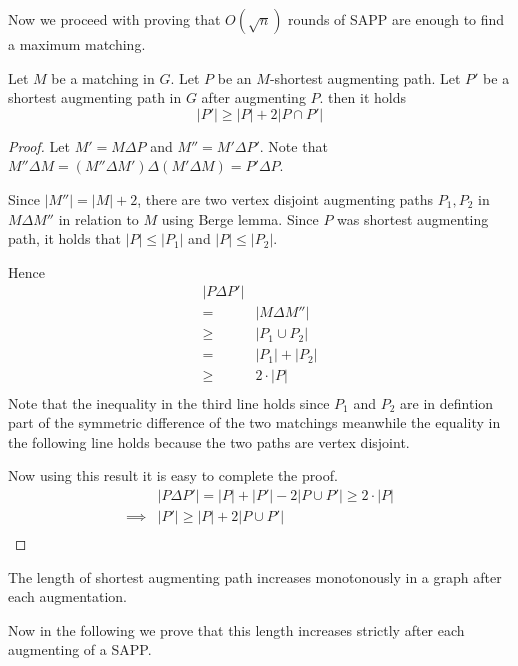 Now we proceed with proving that $O(\sqrt n)$ rounds of SAPP are enough to find a maximum matching.

\begin{lemma}
	Let $M$ be a matching in $G$. Let $P$ be an $M$-shortest augmenting path. Let $P'$ be a shortest augmenting path in $G$ after augmenting $P$. then it holds
	\[
		|P'| \geq |P| + 2 |P \cap P'|
	\]
\end{lemma}
\begin{proof}
	Let $M' = M \Delta P$ and $M'' = M' \Delta P'$. Note that $M'' \Delta M = (M'' \Delta M') \Delta (M' \Delta M) = P' \Delta P$.

	Since $|M''| = |M| + 2$, there are two vertex disjoint augmenting paths $P_1, P_2$ in $M \Delta M''$ in relation to $M$ using Berge lemma. Since $P$ was shortest augmenting path, it holds that $|P| \leq |P_1|$ and $|P| \leq |P_2|$.

	Hence
	\begin{align*}
		|P \Delta P'|&\\
		=& |M \Delta M''|\\
		\geq& |P_1 \cup P_2|\\
		=& |P_1| + |P_2|\\
		\geq& 2 \cdot |P|\\
	\end{align*}
	Note that the inequality in the third line holds since $P_1$ and $P_2$ are in defintion part of the symmetric difference of the two matchings meanwhile the equality in the following line holds because the two paths are vertex disjoint.

	Now using this result it is easy to complete the proof.
	\begin{align*}
		&|P \Delta P'| = |P| + |P'| - 2 |P \cup P'| \geq 2 \cdot |P|\\
		\implies&|P'| \geq |P| + 2|P \cup P'|\\
	\end{align*}

	
\end{proof}


\begin{corollary}
	The length of shortest augmenting path increases monotonously in a graph after each augmentation.
\end{corollary}

Now in the following we prove that this length increases strictly after each augmenting of a SAPP.


